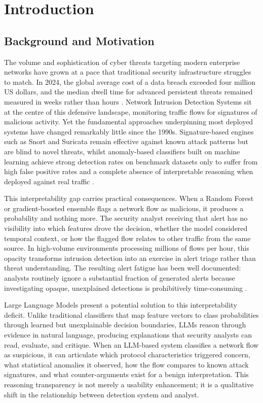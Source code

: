 \chapter{Introduction}
\label{ch:introduction}

\section{Background and Motivation}
\label{sec:background-motivation}

The volume and sophistication of cyber threats targeting modern enterprise networks have grown at a pace that traditional security infrastructure struggles to match. In 2024, the global average cost of a data breach exceeded four million US dollars, and the median dwell time for advanced persistent threats remained measured in weeks rather than hours \autocite{IBM2024}. Network Intrusion Detection Systems sit at the centre of this defensive landscape, monitoring traffic flows for signatures of malicious activity. Yet the fundamental approaches underpinning most deployed systems have changed remarkably little since the 1990s. Signature-based engines such as Snort and Suricata remain effective against known attack patterns but are blind to novel threats, whilst anomaly-based classifiers built on machine learning achieve strong detection rates on benchmark datasets only to suffer from high false positive rates and a complete absence of interpretable reasoning when deployed against real traffic \autocite{Hesford2024}.

This interpretability gap carries practical consequences. When a Random Forest or gradient-boosted ensemble flags a network flow as malicious, it produces a probability and nothing more. The security analyst receiving that alert has no visibility into which features drove the decision, whether the model considered temporal context, or how the flagged flow relates to other traffic from the same source. In high-volume environments processing millions of flows per hour, this opacity transforms intrusion detection into an exercise in alert triage rather than threat understanding. The resulting alert fatigue has been well documented: analysts routinely ignore a substantial fraction of generated alerts because investigating opaque, unexplained detections is prohibitively time-consuming \autocite{Alahmadi2020}.

Large Language Models present a potential solution to this interpretability deficit. Unlike traditional classifiers that map feature vectors to class probabilities through learned but unexplainable decision boundaries, LLMs reason through evidence in natural language, producing explanations that security analysts can read, evaluate, and critique. When an LLM-based system classifies a network flow as suspicious, it can articulate which protocol characteristics triggered concern, what statistical anomalies it observed, how the flow compares to known attack signatures, and what counter-arguments exist for a benign interpretation. This reasoning transparency is not merely a usability enhancement; it is a qualitative shift in the relationship between detection system and analyst.

